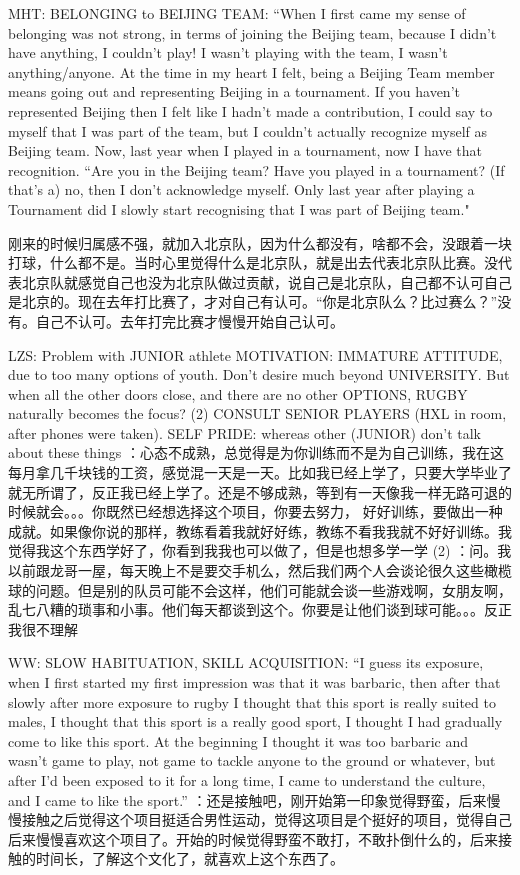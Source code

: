 \begin{CJK}{UTF8}{gbsn}
MHT:
BELONGING to BEIJING TEAM: “When I first came my sense of belonging was not strong, in terms of joining the Beijing team, because I didn’t have anything, I couldn’t play! I wasn’t playing with the team, I wasn’t anything/anyone.  At the time in my heart I felt, being a Beijing Team member means going out and representing Beijing in a tournament.  If you haven’t represented Beijing then I felt like I hadn’t made a contribution, I could say to myself that I was part of the team, but I couldn’t actually recognize myself as Beijing team. Now, last year when I played in a tournament, now I have that recognition. “Are you in the Beijing team? Have you played in a tournament? (If that's a) no, then I don’t acknowledge myself.  Only last year after playing a Tournament did I slowly start recognising that I was part of Beijing team."

刚来的时候归属感不强，就加入北京队，因为什么都没有，啥都不会，没跟着一块打球，什么都不是。当时心里觉得什么是北京队，就是出去代表北京队比赛。没代表北京队就感觉自己也没为北京队做过贡献，说自己是北京队，自己都不认可自己是北京的。现在去年打比赛了，才对自己有认可。“你是北京队么？比过赛么？”没有。自己不认可。去年打完比赛才慢慢开始自己认可。 


LZS:
Problem with JUNIOR athlete MOTIVATION: IMMATURE ATTITUDE, due to too many options of youth. Don’t desire much beyond UNIVERSITY.  But when all the other doors close, and there are no other OPTIONS, RUGBY naturally becomes the focus? (2) CONSULT SENIOR PLAYERS (HXL in room, after phones were taken). SELF PRIDE: whereas other (JUNIOR) don’t talk about these things	：心态不成熟，总觉得是为你训练而不是为自己训练，我在这每月拿几千块钱的工资，感觉混一天是一天。比如我已经上学了，只要大学毕业了就无所谓了，反正我已经上学了。还是不够成熟，等到有一天像我一样无路可退的时候就会。。。你既然已经想选择这个项目，你要去努力， 好好训练，要做出一种成就。如果像你说的那样，教练看着我就好好练，教练不看我我就不好好训练。我觉得我这个东西学好了，你看到我我也可以做了，但是也想多学一学  (2) ：问。我以前跟龙哥一屋，每天晚上不是要交手机么，然后我们两个人会谈论很久这些橄榄球的问题。但是别的队员可能不会这样，他们可能就会谈一些游戏啊，女朋友啊，乱七八糟的琐事和小事。他们每天都谈到这个。你要是让他们谈到球可能。。。反正我很不理解


WW:
SLOW HABITUATION, SKILL ACQUISITION: “I guess its exposure, when I first started my first impression was that it was barbaric, then after that slowly after more exposure to rugby I thought that this sport is really suited to males, I thought that this sport is a really good sport, I thought I had gradually come to like this sport.  At the beginning I thought it was too barbaric and wasn’t game to play, not game to tackle anyone to the ground or whatever, but after I’d been exposed to it for a long time, I came to understand the culture, and I came to like the sport.”	：还是接触吧，刚开始第一印象觉得野蛮，后来慢慢接触之后觉得这个项目挺适合男性运动，觉得这项目是个挺好的项目，觉得自己后来慢慢喜欢这个项目了。开始的时候觉得野蛮不敢打，不敢扑倒什么的，后来接触的时间长，了解这个文化了，就喜欢上这个东西了。



\end{CJK}
